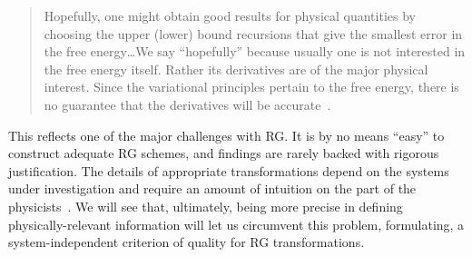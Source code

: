 \begin{quote}
  Hopefully, one might obtain good results for physical quantities by
  choosing the upper (lower) bound recursions that give the smallest
  error in the free energy\ldots We say ``hopefully'' because usually
  one is not interested in the free energy itself. Rather its
  derivatives are of the major physical interest.  Since the
  variational principles pertain to the free energy, there is no
  guarantee that the derivatives will be accurate~\cite{kadanoff}.
\end{quote}\label{sec:kadanoff-quote}
%
This reflects one of the major challenges with RG\@.  It is by no
means ``easy'' to construct adequate RG schemes, and findings are
rarely backed with rigorous justification. The details of appropriate
transformations depend on the systems under investigation and require
an amount of intuition on the part of the physicists~\cite{kjr}.  We
will see that, ultimately, being more precise in defining
physically-relevant information will let us circumvent this problem,
formulating, a system-independent criterion of quality for RG
transformations.

